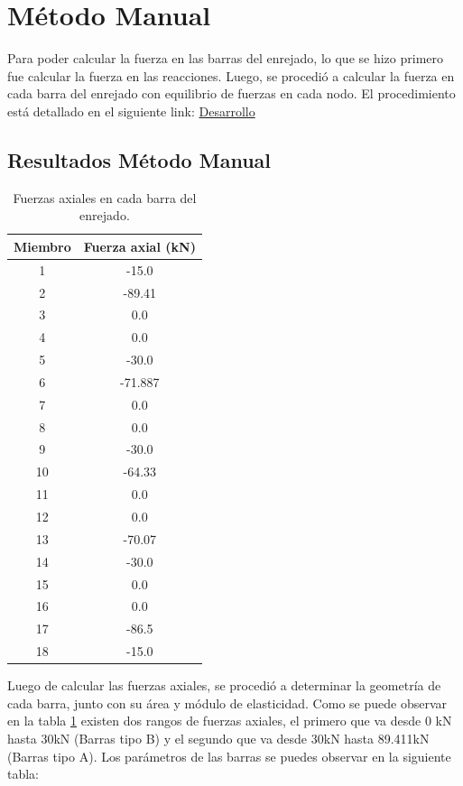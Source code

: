 \documentclass{article}  %
\begin{document}
\newpage
\section{Método Manual}
Para poder calcular la fuerza en las barras del enrejado, lo que se hizo primero fue calcular la fuerza en las reacciones. Luego, se procedió a calcular la fuerza en cada barra del enrejado con equilibrio de fuerzas en cada nodo. El procedimiento está detallado en el siguiente link: \href{https://github.com/berckanala/P2E0_MCOC/tree/main/desarrollo}{Desarrollo}

\subsection{Resultados Método Manual}
\begin{table}[h!]
  \centering
  \begin{tabular}{|c|c|}
  \hline
  \textbf{Miembro} & \textbf{Fuerza axial (kN)} \\
  \hline
  1  & -15.0   \\
  2  & -89.41 \\
  3  & 0.0     \\
  4  & 0.0    \\
  5  & -30.0   \\
  6  & -71.887 \\
  7  & 0.0  \\
  8  & 0.0   \\
  9  & -30.0   \\
  10 & -64.33 \\
  11 & 0.0  \\
  12 & 0.0    \\
  13 & -70.07 \\
  14 & -30.0   \\
  15 & 0.0     \\
  16 & 0.0    \\
  17 & -86.5 \\
  18 & -15.0   \\
  \hline
  \end{tabular}
  \caption{Fuerzas axiales en cada barra del enrejado.}
  \label{tab:1}
\end{table}
Luego de calcular las fuerzas axiales, se procedió a determinar la geometría de cada barra, junto con su área y módulo de elasticidad. Como se puede observar en la tabla \ref{tab:1} existen dos rangos de fuerzas axiales, el primero que va desde 0 kN hasta 30kN (Barras tipo B) y el segundo que va desde 30kN hasta 89.411kN (Barras tipo A). Los parámetros de las barras se puedes observar en la siguiente tabla:
\end{document}

